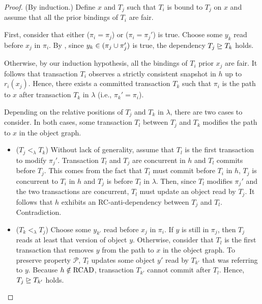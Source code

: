 \begin{proof}

  (By induction.)
  Define $x$ and $T_j$ such that $T_i$ is bound to $T_j$ on $x$ and assume that all the prior bindings of $T_i$ are fair.

  First, consider that either ($\pi_i = \pi_j$) or ($\pi_i = \pi_j'$) is true.
  Choose some $y_k$ read before $x_j$ in $\pi_i$.
  By , since $y_k \in (\pi_j \cup \pi_j')$ is true, the dependency $T_j \mathrel{\unrhd} T_k$ holds.
  
  Otherwise, by our induction hypothesis, all the bindings of $T_i$ prior $x_j$ are fair.
  It follows that transaction $T_i$ observes a strictly consistent snapshot in $h$ up to $r_i(x_j)$.
  Hence, there exists a committed transaction $T_k$ such that $\pi_i$ is the path to $x$ after transaction $T_k$ in $\lambda$ (i.e., $\pi_k'= \pi_i$).

  Depending on the relative positions of $T_j$ and $T_k$ in $\lambda$, there are two cases to consider.
  In both cases, some transaction $T_l$ between $T_j$ and $T_k$ modifies the path to $x$ in the object graph.
  \begin{itemize}
  \item ($T_j <_{\lambda} T_k$)
    Without lack of generality, assume that $T_l$ is the first transaction to modify $\pi_j'$.
    Transaction $T_l$ and $T_j$ are concurrent in $h$ and $T_l$ commits before $T_j$.
    This comes from the fact that $T_l$ must commit before $T_i$ in $h$, $T_j$ is concurrent to $T_i$ in $h$ and $T_j$ is before $T_l$ in $\lambda$.
    Then, since $T_l$ modifies $\pi_j'$ and the two transactions are concurrent, $T_l$ must update an object read by $T_j$.
    It follows that $h$ exhibits an RC-anti-dependency between $T_j$ and $T_l$.
    Contradiction.    
  \item ($T_k <_{\lambda} T_j$)
    Choose some $y_{k'}$ read before $x_j$ in $\pi_i$.
    If $y$ is still in $\pi_j$, then $T_j$ reads at least that version of object $y$.
    Otherwise, consider that $T_l$ is the first transaction that removes $y$ from the path to $x$ in the object graph.
    To preserve property $\mathcal{P}$, $T_l$ updates some object $y'$ read by $T_{k'}$ that was referring to $y$.
    Because $h \notin \RCAD$, transaction $T_{k'}$ cannot commit after $T_l$.
    Hence, $T_j \mathrel{\unrhd} T_{k'}$ holds.
  \end{itemize}
\end{proof}

